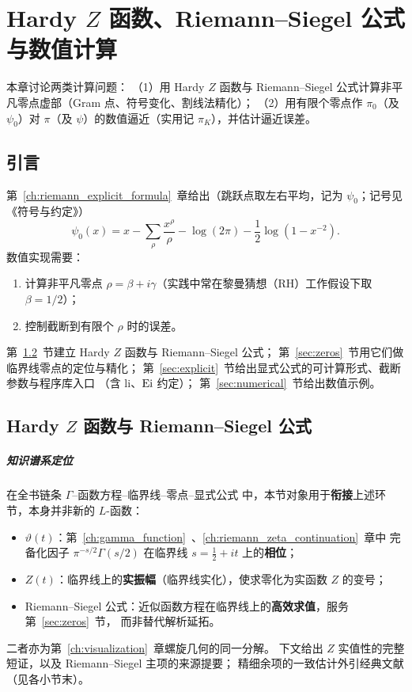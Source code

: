 
\chapter{Hardy \texorpdfstring{$Z$}{Z} 函数、Riemann--Siegel 公式与数值计算}\label{ch:riemann_numerical_approximation}

本章讨论两类计算问题：
（1）用 Hardy $Z$ 函数与 Riemann--Siegel 公式计算非平凡零点虚部（Gram 点、符号变化、割线法精化）；
（2）用有限个零点作 $\pi_0$（及 $\psi_0$）对 $\pi$（及 $\psi$）的数值逼近（实用记 $\pi_K$），并估计逼近误差。

\section{引言}

第~\ref{ch:riemann_explicit_formula}~章给出（跳跃点取左右平均，记为 $\psi_0$；记号见《符号与约定》）
\[
\psi_0(x)
=
x
-
\sum_{\rho}\frac{x^{\rho}}{\rho}
-
\log(2\pi)
-
\frac12\log(1-x^{-2}).
\]
数值实现需要：
\begin{enumerate}
  \item 计算非平凡零点 $\rho=\beta+i\gamma$（实践中常在黎曼猜想（RH）工作假设下取 $\beta=1/2$）；
  \item 控制截断到有限个 $\rho$ 时的误差。
\end{enumerate}

第~\ref{sec:hardy_RS}~节建立 Hardy $Z$ 函数与 Riemann--Siegel 公式；
第~\ref{sec:zeros}~节用它们做临界线零点的定位与精化；
第~\ref{sec:explicit}~节给出显式公式的可计算形式、截断参数与程序库入口
（含 $\mathrm{li}$、$\operatorname{Ei}$ 约定）；
第~\ref{sec:numerical}~节给出数值示例。

\section{Hardy \texorpdfstring{$Z$}{Z} 函数与 Riemann--Siegel 公式}\label{sec:hardy_RS}

\paragraph{知识谱系定位}
在全书链条
$\Gamma$--函数方程--临界线--零点--显式公式
中，本节对象用于\textbf{衔接}上述环节，本身并非新的 $L$-函数：
\begin{itemize}
  \item $\vartheta(t)$：第~\ref{ch:gamma_function}~、\ref{ch:riemann_zeta_continuation}~章中
        完备化因子 $\pi^{-s/2}\Gamma(s/2)$ 在临界线 $s=\frac12+it$ 上的\textbf{相位}；
  \item $Z(t)$：临界线上的\textbf{实振幅}（临界线实化），使求零化为实函数 $Z$ 的变号；
  \item Riemann--Siegel 公式：近似函数方程在临界线上的\textbf{高效求值}，服务第~\ref{sec:zeros}~节，
        而非替代解析延拓。
\end{itemize}
二者亦为第~\ref{ch:visualization}~章螺旋几何的同一分解。
下文给出 $Z$ 实值性的完整短证，以及 Riemann--Siegel 主项的来源提要；
精细余项的一致估计外引经典文献（见各小节末）。

